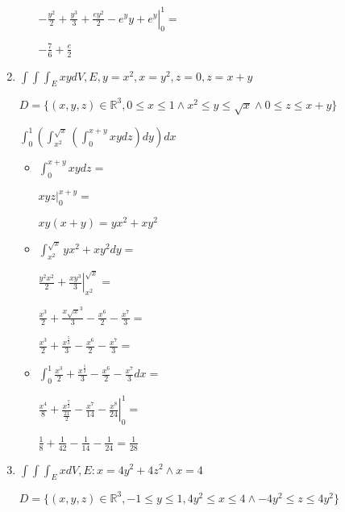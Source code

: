 \documentclass[../practica_08.tex]{subfiles}
\begin{document}
\begin{enumerate}
\begin{itemize}
                    $ \left. -\frac{y^2}{2}+\frac{y^3}{3}+\frac{ey^2}{2}-e^yy+e^y \right |_0^1 = $

                    $ - \frac{7}{6} + \frac{e}{2} $

            \end{itemize}

        \item $ \int \int \int_E xy dV, E, y=x^2, x=y^2, z=0, z= x+y $
        
            $D= \{(x,y,z) \in \mathbb{R}^3, 0\leq x\leq 1 \wedge x^2 \leq y \leq \sqrt{x} \wedge 0 \leq z \leq x+y\}$

            $ \int_0^1(\int_{x^2}^{\sqrt{x}} (\int_0^{x+y} xy dz) dy)dx$

            \begin{itemize}
                \item $\int_0^{x+y} xy dz = $
                
                    $\left. xyz \right |_0^{x+y} = $

                    $ xy(x+y) = yx^2 + xy^2 $

                \item $\int_{x^2}^{\sqrt{x}} yx^2 + xy^2 dy = $

                    $ \left. \frac{y^2x^2}{2} + \frac{xy^3}{3} \right |_{x^2}^{\sqrt{x}} = $

                    $ \frac{x^3}{2} + \frac{x\sqrt{x}^3}{3} - \frac{x^6}{2} - \frac{x^7}{3} =  $

                    $ \frac{x^3}{2} + \frac{x^{\frac{5}{2}}}{3} - \frac{x^6}{2} - \frac{x^7}{3} = $

                \item $\int_0^1 \frac{x^3}{2} + \frac{x^{\frac{5}{2}}}{3} - \frac{x^6}{2} - \frac{x^7}{3} dx = $

                    $ \left. \frac{x^4}{8} + \frac{x^{\frac{7}{2}}}{\frac{21}{2}} - \frac{x^7}{14} - \frac{x^8}{24} \right |_0^1 = $

                    $ \frac{1}{8} + \frac{1}{42} - \frac{1}{14} - \frac{1}{24} = \frac{1}{28} $


            \end{itemize}

        \item $\int \int \int_E x dV, E: x=4y^2+4z^2 \wedge x=4$
        
            $D = \{(x,y,z) \in \mathbb{R}^3, -1 \leq y \leq 1, 4y^2\leq x \leq 4 \wedge -4y^2 \leq z \leq 4y^2\}$


\end{enumerate}
\end{document}

